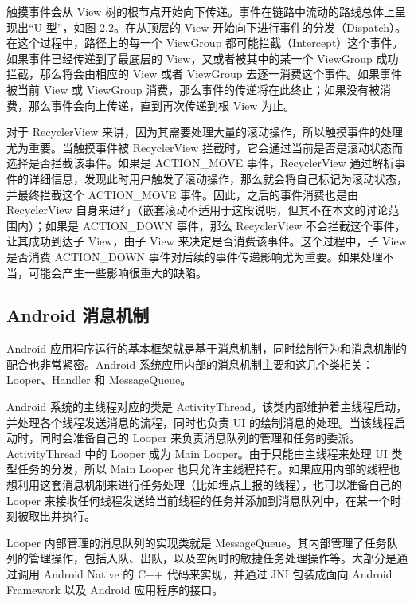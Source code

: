 触摸事件会从 View 树的根节点开始向下传递。事件在链路中流动的路线总体上呈现出“U 型”，如图 2.2。在从顶层的 View 开始向下进行事件的分发（Dispatch）。在这个过程中，路径上的每一个 ViewGroup 都可能拦截（Intercept）这个事件\cite{wu2017appcheck}。如果事件已经传递到了最底层的 View，又或者被其中的某一个 ViewGroup 成功拦截，那么将会由相应的 View 或者 ViewGroup 去逐一消费这个事件。如果事件被当前 View 或 ViewGroup 消费，那么事件的传递将在此终止；如果没有被消费，那么事件会向上传递，直到再次传递到根 View 为止。

对于 RecyclerView 来讲，因为其需要处理大量的滚动操作，所以触摸事件的处理尤为重要。当触摸事件被 RecyclerView 拦截时，它会通过当前是否是滚动状态而选择是否拦截该事件。如果是 ACTION\_MOVE 事件，RecyclerView 通过解析事件的详细信息，发现此时用户触发了滚动操作，那么就会将自己标记为滚动状态，并最终拦截这个 ACTION\_MOVE 事件。因此，之后的事件消费也是由 RecyclerView 自身来进行（嵌套滚动不适用于这段说明，但其不在本文的讨论范围内）；如果是 ACTION\_DOWN 事件，那么 RecyclerView 不会拦截这个事件，让其成功到达子 View，由子 View 来决定是否消费该事件。这个过程中，子 View 是否消费 ACTION\_DOWN 事件对后续的事件传递影响尤为重要。如果处理不当，可能会产生一些影响很重大的缺陷。


\subsection{Android 消息机制}

Android 应用程序运行的基本框架就是基于消息机制，同时绘制行为和消息机制的配合也非常紧密。Android 系统应用内部的消息机制主要和这几个类相关：Looper、Handler 和 MessageQueue。

Android 系统的主线程对应的类是 ActivityThread。该类内部维护着主线程启动，并处理各个线程发送消息的流程，同时也负责 UI 的绘制消息的处理。当该线程启动时，同时会准备自己的 Looper 来负责消息队列的管理和任务的委派。ActivityThread 中的 Looper 成为 Main Looper。由于只能由主线程来处理 UI 类型任务的分发，所以 Main Looper 也只允许主线程持有。如果应用内部的线程也想利用这套消息机制来进行任务处理（比如埋点上报的线程），也可以准备自己的 Looper 来接收任何线程发送给当前线程的任务并添加到消息队列中，在某一个时刻被取出并执行。

Looper 内部管理的消息队列的实现类就是 MessageQueue。其内部管理了任务队列的管理操作，包括入队、出队，以及空闲时的敏捷任务处理操作等。大部分是通过调用 Android Native 的 C++ 代码来实现，并通过 JNI 包装成面向 Android Framework 以及 Android 应用程序的接口。

